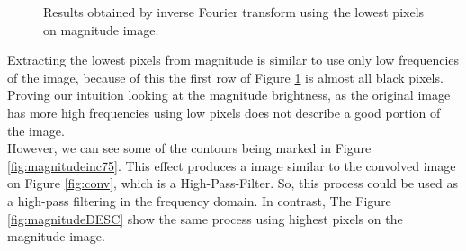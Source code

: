 \documentclass[12pt,a4paper]{article}
\begin{document}
\begin{figure}[!h]
{{		}
		\label{fig:magnitudeinc50}
	}
	\quad
	
	\caption{Results obtained by inverse Fourier transform using the lowest pixels on magnitude image.}
	\label{fig:magnitudeINC}
\end{figure}
	
Extracting the lowest pixels from magnitude is similar to use only low frequencies of the image, because of this the first row of Figure \ref{fig:magnitudeINC} is almost all black pixels. Proving our intuition looking at the magnitude brightness, as the original image has more high frequencies using low pixels does not describe a good portion of the image. \\

However, we can see some of the contours being marked in Figure \ref{fig:magnitudeinc75}. This effect produces a image similar to the convolved image on Figure \ref{fig:conv}, which is a High-Pass-Filter. So, this process could be used as a high-pass filtering in the frequency domain. In contrast, The Figure \ref{fig:magnitudeDESC} show the same process using highest pixels on the magnitude image. \\
\end{document}
